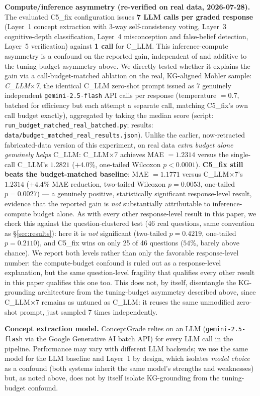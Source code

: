 \documentclass[conference]{IEEEtran}
\begin{document}
\textbf{Compute/inference asymmetry (re-verified on real data,
2026-07-28).} The evaluated C5\_fix configuration issues \textbf{7 LLM
calls per graded response} (Layer~1 concept extraction with 3-way
self-consistency voting, Layer~3 cognitive-depth classification,
Layer~4 misconception and false-belief detection, Layer~5 verification)
against \textbf{1 call} for C\_LLM. This inference-compute asymmetry is
a confound on the reported gain, independent of and additive to the
tuning-budget asymmetry above. We directly tested whether it explains
the gain via a call-budget-matched ablation on the real, KG-aligned
Mohler sample: \textit{C\_LLM$\times$7}, the identical C\_LLM zero-shot
prompt issued as 7 genuinely independent \texttt{gemini-2.5-flash} API
calls per response (temperature $=0.7$, batched for efficiency but each
attempt a separate call, matching C5\_fix's own call budget exactly),
aggregated by taking the median score (script:
\texttt{run\_budget\_matched\_real\_batched.py}; results:
\texttt{data/budget\_matched\_real\_results.json}). Unlike the earlier,
now-retracted fabricated-data version of this experiment, on real data
\emph{extra budget alone genuinely helps} C\_LLM: C\_LLM$\times$7
achieves MAE $=1.2314$ versus the single-call C\_LLM's $1.2821$
($+4.0\%$, one-tailed Wilcoxon $p<0.0001$). \textbf{C5\_fix still beats
the budget-matched baseline}: MAE $=1.1771$ versus C\_LLM$\times$7's
$1.2314$ ($+4.4\%$ MAE reduction, two-tailed Wilcoxon $p=0.0053$,
one-tailed $p=0.0027$) --- a genuinely positive, statistically
significant response-level result, evidence that the reported gain is
\emph{not} substantially attributable to inference-compute budget alone.
As with every other response-level result in this paper, we check this
against the question-clustered test (46 real questions, same convention
as \S\ref{sec:results}): here it is \emph{not} significant (two-tailed
$p=0.4219$, one-tailed $p=0.2110$), and C5\_fix wins on only 25 of 46
questions ($54\%$, barely above chance). We report both levels rather
than only the favorable response-level number: the compute-budget
confound is ruled out as a response-level explanation, but the same
question-level fragility that qualifies every other result in this
paper qualifies this one too. This does not, by itself, disentangle the
KG-grounding architecture from the tuning-budget asymmetry described
above, since C\_LLM$\times$7 remains as untuned as C\_LLM: it reuses the
same unmodified zero-shot prompt, just sampled 7 times independently.

\textbf{Concept extraction model.} ConceptGrade relies on an LLM
(\texttt{gemini-2.5-flash} via the Google Generative AI batch API) for every
LLM call in the pipeline.
Performance may vary with different LLM backends; we use the same model for
the LLM baseline and Layer~1 by design, which isolates \emph{model choice}
as a confound (both systems inherit the same model's strengths and
weaknesses) but, as noted above, does not by itself isolate KG-grounding
from the tuning-budget confound.
\end{document}
